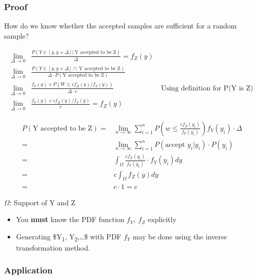 \documentclass[11pt]{article}
\begin{document}
\subsubsection{Proof}
\label{sec:org129ebc9}

How do we know whether the accepted samples are sufficient for a random sample?

\begin{equation}
\begin{split}
\lim_{\Delta \to 0} & \frac{P(Y \in [y, y + \Delta] | \ \text{Y accepted to be Z})}{\Delta} = f_Z (y)\\
\lim_{\Delta \to 0} & \frac{P(Y \in [y, y + \Delta] \cap \ \text{Y accepted to be Z})}{\Delta \cdot P(\text{Y accepted to be Z})}\\
\lim_{\Delta \to 0} & \frac{f_Y(y) \times P(W \leq c f_Z(y)/ f_Y(y))}{\Delta \cdot c} & \ \text{Using definition for P(Y is Z)}\\
\lim_{\Delta \to 0} & \frac{f_Y(y) \times c f_Z(y)/ f_Y(y)}{c} = f_Z (y)
\end{split}
\end{equation}

\begin{equation}
\begin{split}
P(\text{Y accepted to be Z}) = & \lim_{n \to \infty} \sum_{i = 1}^{n} P (w \leq \frac{c f_Z (y_i)}{f_Y (y_i)}) f_Y (y_i) \cdot \Delta\\
= & \lim_{n \to \infty} \sum_{i = 1}^{n} P (\text{accept } y_i | y_i) \cdot P(y_i)\\
= & \int_\Omega \frac{c f_Z (y_i)}{f_Y (y_i)} \cdot f_Y (y_i) dy\\
= & c \int_\Omega f_Z (y) dy\\
= & c \cdot 1 = c
\end{split}
\end{equation}

\(\Omega\): Support of Y and Z

\begin{itemize}
\item You \textbf{must} know the PDF function \(f_Y, \ f_Z\) explicitly
\item Generating \$Y\textsubscript{1}, Y\textsubscript{2},\ldots{}\$ with PDF \(f_Y\) may be done using the inverse
transformation method.
\end{itemize}

\subsubsection{Application}
\label{sec:org9346ffd}
\end{document}
